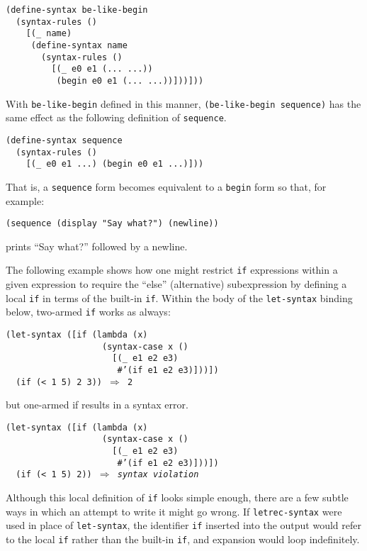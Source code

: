 \begin{alltt}
(define-syntax be-like-begin
  (syntax-rules ()
    [(\_{} name)
     (define-syntax name
       (syntax-rules ()
         [(\_{} e0 e1 (... ...))
          (begin e0 e1 (... ...))]))]))
\end{alltt}


With \texttt{be-like-begin} defined in this manner,
\texttt{(be-like-begin sequence)} has the same effect as
the following definition of \label{syntax_s55}\texttt{sequence}.


\begin{alltt}
(define-syntax sequence
  (syntax-rules ()
    [(\_{} e0 e1 ...) (begin e0 e1 ...)]))
\end{alltt}


That is, a \texttt{sequence} form becomes equivalent to a \texttt{begin}
form so that, for example:


\texttt{(sequence (display "Say what?") (newline))}

prints ``Say what?'' followed by a newline.


The following example shows how one might restrict
\texttt{if} expressions within a given expression to require the
``else'' (alternative) subexpression by defining a local \texttt{if} in
terms of the built-in \texttt{if}.
Within the body of the \texttt{let-syntax} binding below,
two-armed \texttt{if} works as always:


\begin{alltt}
(let-syntax ([if (lambda (x)
                   (syntax-case x ()
                     [(\_{} e1 e2 e3)
                      \#{}'(if e1 e2 e3)]))])
  (if (\textless{} 1 5) 2 3)) \(\Rightarrow\) 2
\end{alltt}


but one-armed if results in a syntax error.


\begin{alltt}
(let-syntax ([if (lambda (x)
                   (syntax-case x ()
                     [(\_{} e1 e2 e3)
                      \#{}'(if e1 e2 e3)]))])
  (if (\textless{} 1 5) 2)) \(\Rightarrow\) \textit{syntax violation}
\end{alltt}


Although this local definition of \texttt{if} looks simple enough,
there are a few subtle ways in which an attempt to write it might go
wrong.
If \label{syntax_s56}\texttt{letrec-syntax} were used in
place of \label{syntax_s57}\texttt{let-syntax},
the identifier \texttt{if} inserted into the 
output would refer to the local \texttt{if}
rather than the built-in \texttt{if}, and expansion would loop
indefinitely.


